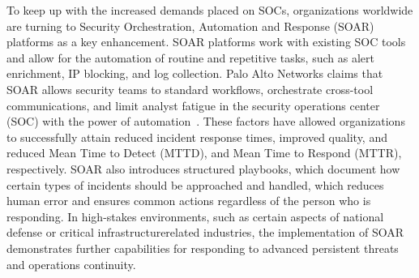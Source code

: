 To keep up with the increased demands placed on SOCs, organizations worldwide are turning to Security Orchestration, Automation and Response (SOAR) platforms as a key enhancement. SOAR platforms work with existing SOC tools and allow for the automation of routine and repetitive tasks, such as alert enrichment, IP blocking, and log collection. Palo Alto Networks claims that SOAR allows security teams to standard workflows, orchestrate cross-tool communications, and limit analyst fatigue in the security operations center (SOC) with the power of automation~\cite{paloalto}. These factors have allowed organizations to successfully attain reduced incident response times, improved quality, and reduced Mean Time to Detect (MTTD), and Mean Time to Respond (MTTR), respectively. SOAR also introduces structured playbooks, which document how certain types of incidents should be approached and handled, which reduces human error and ensures common actions regardless of the person who is responding. In high-stakes environments, such as certain aspects of national defense or critical infrastructurerelated industries, the implementation of SOAR demonstrates further capabilities for responding to advanced persistent threats and operations continuity.

